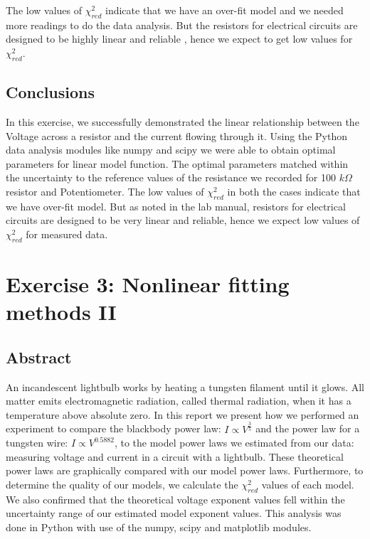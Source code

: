 \documentclass[letterpaper,12pt]{article}
\begin{document}
The low values of $\chi_{red}^2$ indicate that we have an over-fit model and we needed more readings to do the data analysis. But 
the resistors for electrical circuits are designed to be highly linear and reliable \cite{lab-manual-ex1}, hence we expect to get low values 
for $\chi_{red}^2$. 

\subsection{Conclusions}

In this exercise, we successfully demonstrated the linear relationship between the Voltage across a 
resistor and  the current flowing through it. Using the Python data analysis modules like numpy and scipy we 
were able to obtain optimal parameters for linear model function. The optimal parameters matched within
the uncertainty to the reference values of the resistance we recorded for 100 $k\Omega$ resistor and
Potentiometer. The low values of $\chi_{red}^2$ in both the cases
indicate that we have over-fit model. But as noted in the lab manual\cite{lab-manual-ex1}, resistors
for electrical circuits are designed to be very linear and reliable, hence we expect low values of
$\chi_{red}^2$ for measured data.

\pagebreak

\section{Exercise 3:  Nonlinear fitting methods II}

\subsection{Abstract}

An incandescent lightbulb works by heating a tungsten filament until it glows. 
All matter emits electromagnetic radiation, called thermal radiation, 
when it has a temperature above absolute zero. 
In this report we present how we performed an experiment to compare 
the blackbody power law: $I \propto V^{\frac{3}{5}}$ and the power law for a tungsten wire: 
$I \propto V^{0.5882}$, to the model power laws we estimated from our data: 
measuring voltage and current in a circuit with a lightbulb. 
These theoretical power laws are graphically compared with 
our model power laws. Furthermore, to determine the quality of our models, 
we calculate the $\chi^2_{red}$ values of each model. We also confirmed 
that the theoretical voltage exponent values fell within the uncertainty range 
of our estimated model exponent values. This analysis was done in Python with use 
of the numpy, scipy and matplotlib modules.
\end{document}
